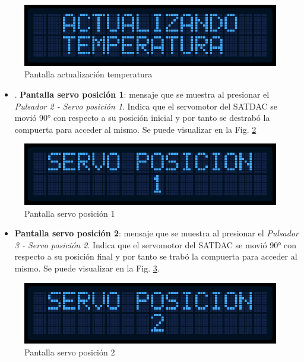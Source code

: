 \documentclass[conference]{IEEEtran}
\begin{document}
\begin{figure}[htbp]
\centering
\includegraphics[width=.9\linewidth]{../../images/pantallaTemperatura.png}
\caption{\label{fig:pantallaTemperatura}Pantalla actualización temperatura}
\end{figure}

\begin{itemize}
\item . \textbf{Pantalla servo posición 1}: mensaje que se muestra al presionar el \emph{Pulsador 2 - Servo posición 1}. Indica que el servomotor del SATDAC se movió 90° con respecto a su posición inicial y por tanto se destrabó la compuerta para acceder al mismo. Se puede visualizar en la Fig. \ref{fig:pantallaServo1}
\end{itemize}

\begin{figure}[htbp]
\centering
\includegraphics[width=.9\linewidth]{../../images/pantallaServo1.png}
\caption{\label{fig:pantallaServo1}Pantalla servo posición 1}
\end{figure}

\begin{itemize}
\item \textbf{Pantalla servo posición 2}: mensaje que se muestra al presionar el \emph{Pulsador 3 - Servo posición 2}. Indica que el servomotor del SATDAC se movió 90° con respecto a su posición final y por tanto se trabó la compuerta para acceder al mismo. Se puede visualizar en la Fig. \ref{fig:pantallaServo2}.
\end{itemize}

\begin{figure}[htbp]
\centering
\includegraphics[width=.9\linewidth]{../../images/pantallaServo2.png}
\caption{\label{fig:pantallaServo2}Pantalla servo posición 2}
\end{figure}
\end{document}
